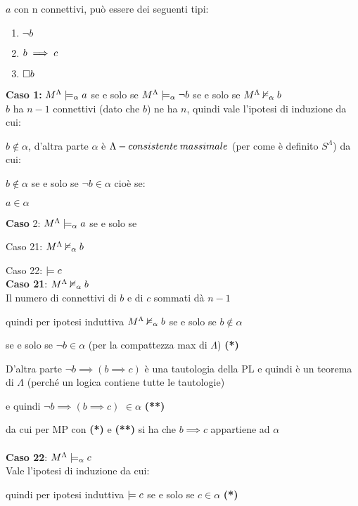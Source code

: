  $a$ con n connettivi, può essere
dei seguenti tipi: 
\begin{enumerate}
\item $\neg b$ 
\item $b\implies c$ 
\item $\square b$ 
\end{enumerate}
\textbf{Caso 1:} $M^{\Lambda}\models_{\alpha}a$ se e solo
se $M^{\Lambda}\models_{\alpha}\neg b$ se e solo se $M^{\Lambda}\nvDash_{\alpha}b$\\


$b$ ha $n-1$ connettivi (dato che $b$) ne ha $n$, quindi vale
l'ipotesi di induzione da cui:

$b\notin\alpha$, d'altra parte $\alpha$ è $\Lambda-consistente\: massimale$ (per come
è definito $S^{\Lambda}$) da cui:

\textbf{$b\notin\alpha$ }se e solo se \textbf{$ $}$\neg b\in\alpha$
cioè se:

$a\in\alpha$

\textbf{Caso} 2:$ $ $M^{\Lambda}\models_{\alpha}a$ se e solo
se

Caso 21: $M^{\Lambda}\nvDash_{\alpha}b$

Caso 22: $\models c$\\


\textbf{Caso 21}: $M^{\Lambda}\nvDash_{\alpha}b$ \\


Il numero di connettivi di $b$ e di $c$ sommati dà $n-1$

quindi per ipotesi induttiva $M^{\Lambda}\nvDash_{\alpha}b$ se e solo se
$b\notin\alpha$

se e solo se $\neg b\in\alpha$ (per la compattezza max di $\Lambda$)
\textbf{({*})}

D'altra parte $\neg b\implies(b\implies c)$ è una tautologia della
PL e quindi è un teorema di $\Lambda$ (perché un logica contiene
tutte le tautologie)

e quindi $\neg b\implies(b\implies c)$ $\in\alpha$ \textbf{({*}{*})}

da cui per MP con \textbf{({*})} e \textbf{({*}{*})} si ha che $b\implies c$
appartiene ad $\alpha$\\
 \\
 \textbf{Caso 22}: $M^{\Lambda}\models_{\alpha}c$\\


Vale l'ipotesi di induzione da cui:

quindi per ipotesi induttiva $\models c$ se e solo se $c\in\alpha$
\textbf{({*})}

